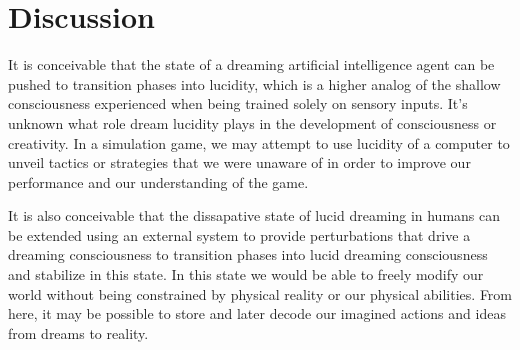 \documentclass{article}
\begin{document}





\section{Discussion}


It is conceivable that the state of a dreaming artificial intelligence agent can be pushed to transition phases into lucidity, which is a higher analog of the shallow consciousness experienced when being trained solely on sensory inputs. It's unknown what role dream lucidity plays in the development of consciousness or creativity. In a simulation game, we may attempt to use lucidity of a computer to unveil tactics or strategies that we were unaware of in order to improve our performance and our understanding of the game. 

It is also conceivable that the dissapative state of lucid dreaming in humans can be extended using an external system to provide perturbations that drive a dreaming consciousness to transition phases into lucid dreaming consciousness and stabilize in this state. In this state we would be able to freely modify our world without being constrained by physical reality or our physical abilities. From here, it may be possible to store and later decode our imagined actions and ideas from dreams to reality. 


\end{document}
